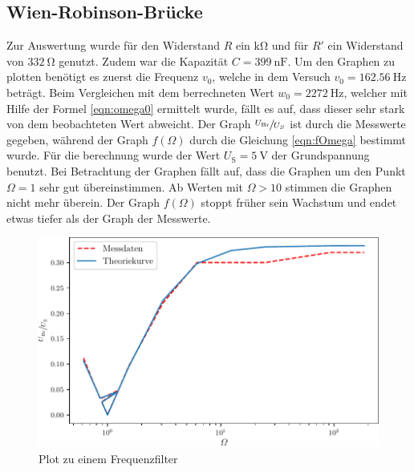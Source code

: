  \subsection{Wien-Robinson-Brücke}
 Zur Auswertung wurde für den Widerstand $R$ ein $\si{\kilo\ohm}$ und für $R'$ ein Widerstand von $\SI{332}{\ohm}$ genutzt.
 Zudem war die Kapazität $C=\SI{399}{\nano\farad}$.
 Um den Graphen zu plotten benötigt es zuerst die Frequenz $v_0$, welche in dem Versuch $v_0=\SI{162.56}{\hertz}$ beträgt.
 Beim Vergleichen mit dem berrechneten Wert $w_0= \SI{2272}{\hertz}$, welcher mit Hilfe der Formel \eqref{eqn:omega0} ermittelt wurde, fällt es auf, dass dieser
 sehr stark von dem beobachteten Wert abweicht.
Der Graph $\sfrac{U_\text{Br}}{U_S}$ ist durch die Messwerte gegeben, während der Graph $f(\Omega)$ durch die Gleichung \eqref{eqn:fOmega} bestimmt wurde. 
Für die berechnung wurde der Wert $U_\text{S}=\SI{5}{\volt}$ der Grundspannung benutzt.
Bei Betrachtung der Graphen fällt auf, dass die Graphen um den Punkt $\Omega=1$ sehr gut übereinstimmen.
Ab Werten mit $\Omega>10$ stimmen die Graphen nicht mehr überein. Der Graph $f(\Omega)$ stoppt früher sein Wachstum und endet etwas tiefer als der Graph der Messwerte.
\begin{figure}
  \caption{Plot zu einem Frequenzfilter}
  \centering
  \includegraphics[width = \textwidth]{build/plot.pdf}
\end{figure}
